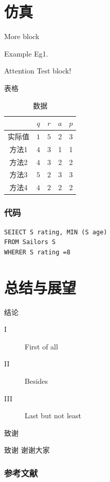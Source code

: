 \documentclass[hyperref,UTF8,11pt]{beamer}
\begin{document}
\section{仿真}

\begin{frame}{More block}
    \begin{exampleblock}{Example}
    Eg1.
    \end{exampleblock}
    \begin{alertblock}{Attention}
        Test block!
    \end{alertblock}
\end{frame}

\begin{frame}{表格}
    \begin{table}[]
        \centering
        \caption{数据}
        \label{tab1}
        \begin{tabular}{@{}ccccc@{}}
        \toprule
                    & $q$         & $r$         & $a$ & $p$           \\ \midrule
        实际值         & $1$  & $5$  & 2   & 3  \\
        方法1          & $4$ & $3$ & 1 & 1\\
        方法2        & $4$ & $3$ & 2 & 2\\
        方法3 & $5$ & $2$ & 3 & 3\\
        方法4          & $4$ & $2$ & 2 & 2\\ \bottomrule
        \end{tabular}
    \end{table}
\end{frame}

\begin{frame}[fragile]
    \frametitle{代码}
    \begin{lstlisting}[basicstyle = \small\ttfamily]
SEIECT S rating, MIN (S age) 
FROM Sailors S 
WHERER S rating =8 \end{lstlisting}
\end{frame}

\section{总结与展望}

\begin{frame}{结论}
    \begin{description}
        \item[I] First of all
        \item[II] Besides
        \item[III] Last but not least
    \end{description}
\end{frame}

\begin{frame}{致谢}
    \begin{block}{致谢}
        谢谢大家
    \end{block}
\end{frame}

\begin{frame}[allowframebreaks]
    \frametitle{参考文献}
    \printbibliography
\end{frame}
\end{document}
